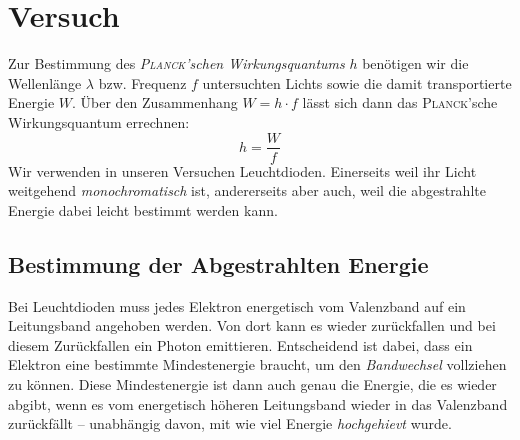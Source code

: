 % 
% 
% 
% 
% 
% 



\section{Versuch}

Zur Bestimmung des \emph{\textsc{Planck}'schen Wirkungsquantums} $h$ benötigen wir die Wellenlänge $\lambda$ bzw. Frequenz $f$ untersuchten Lichts sowie die damit transportierte Energie $W$. Über den Zusammenhang $W = h \cdot f$ lässt sich dann das \textsc{Planck}'sche Wirkungsquantum errechnen:
\begin{equation}
   h = \frac{W}{f}
   \label{eq_hwf}
\end{equation}
Wir verwenden in unseren Versuchen Leuchtdioden. Einerseits weil ihr Licht weitgehend \emph{monochromatisch} ist, andererseits aber auch, weil die abgestrahlte Energie dabei leicht bestimmt werden kann.







\subsection{Bestimmung der Abgestrahlten Energie}

Bei Leuchtdioden muss jedes Elektron energetisch vom Valenzband auf ein Leitungsband angehoben werden. Von dort kann es wieder zurückfallen und bei diesem Zurückfallen ein Photon emittieren. Entscheidend ist dabei, dass ein Elektron eine bestimmte Mindestenergie braucht, um den \textit{Bandwechsel} vollziehen zu können. Diese Mindestenergie ist dann auch genau die Energie, die es wieder abgibt, wenn es vom energetisch höheren Leitungsband wieder in das Valenzband zurückfällt -- unabhängig davon, mit wie viel Energie \textit{hochgehievt} wurde.

